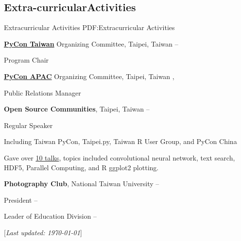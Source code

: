 \documentclass[a4paper,12pt,oneside]{article}
\newcommand{\CVNote}{Last updated: {\today}}
\begin{document}
\begin{body}

\section{Extra-\newline curricular\newline Activities}
{Extracurricular Activities}
{PDF:Extracurricular Activities}

\href{http://pycon.tw}{\textbf{PyCon Taiwan}} Organizing Committee, Taipei, Taiwan
\hfill
{} --
\par
Program Chair

\EntryGapNoBreak
\href{http://pycon.tw}{\textbf{PyCon APAC}} Organizing Committee, Taipei, Taiwan
\hfill
{},
\par
Public Relations Manager

\BigEntryGapNoBreak
\textbf{Open Source Communities}, Taipei, Taiwan
\hfill
{} --
\par
Regular Speaker
\begin{detail}
    \begin{detailitem}
    \item Including Taiwan PyCon, Taipei.py, Taiwan R User Group, and PyCon China
    \item Gave over \href{http://blog.liang2.tw/talks/#talks}{10 talks}, topics included
        convolutional neural network, text search,
        HDF5, Parallel Computing, and R ggplot2 plotting.
    \end{detailitem}
\end{detail}

\BigEntryGap
\textbf{Photography Club},
National Taiwan University
\hfill
{} --

President
\hfill
{} --

Leader of Education Division
\hfill
{} --

%
\end{body}


\begin{flushright}
\scriptsize%
[\textit{\CVNote}]%
\hspace{2.0mm}\null
\end{flushright}

\label{LastPage}
\end{document}
